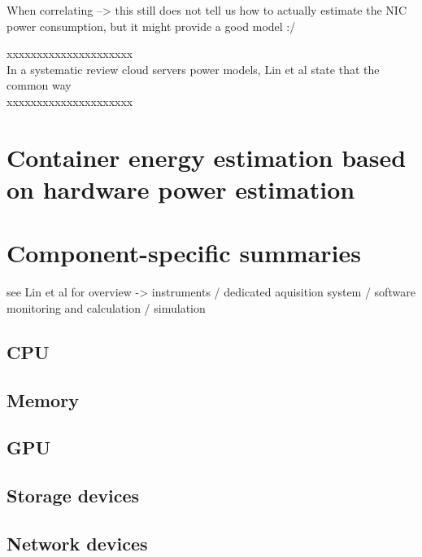 When correlating --> this still does not tell us how to actually estimate the NIC power consumption, but it might provide a good model :/



\parencite{arjonaarocaMeasurementbasedAnalysisEnergy2014} %








xxxxxxxxxxxxxxxxxxxxx\\
In a systematic review cloud servers power models, Lin et al\parencite{lin2020taxonomy} state that the common way\\
xxxxxxxxxxxxxxxxxxxxx\\






\section{Container energy estimation based on hardware power estimation}


\section{Component-specific summaries}
\label{sec:component_specific_summaries}

see Lin et al for overview -> instruments / dedicated aquisition system / software monitoring and calculation / simulation

\subsection{CPU}

\subsection{Memory}

\subsection{GPU}

\subsection{Storage devices}

\subsection{Network devices}